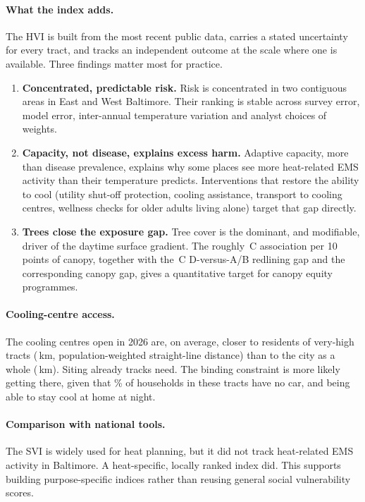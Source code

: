 \documentclass[11pt]{article}
\newcommand{\degC}{\,\textdegree C}
\begin{document}
\paragraph{What the index adds.} The HVI is built from the most recent public data, carries a stated uncertainty for every tract, and tracks an independent outcome at the scale where one is available. Three findings matter most for practice.
\begin{enumerate}
  \item \textbf{Concentrated, predictable risk.} Risk is concentrated in two contiguous areas in East and West Baltimore. Their ranking is stable across survey error, model error, inter-annual temperature variation and analyst choices of weights.
  \item \textbf{Capacity, not disease, explains excess harm.} Adaptive capacity, more than disease prevalence, explains why some places see more heat-related EMS activity than their temperature predicts. Interventions that restore the ability to cool (utility shut-off protection, cooling assistance, transport to cooling centres, wellness checks for older adults living alone) target that gap directly.
  \item \textbf{Trees close the exposure gap.} Tree cover is the dominant, and modifiable, driver of the daytime surface gradient. The roughly \BTreeTen\degC{} association per 10 points of canopy, together with the \HolcDminusAB\degC{} D-versus-A/B redlining gap and the corresponding canopy gap, gives a quantitative target for canopy equity programmes.
\end{enumerate}

\paragraph{Cooling-centre access.} The \NCool{} cooling centres open in 2026 are, on average, closer to residents of very-high tracts (\VHdist\,km, population-weighted straight-line distance) than to the city as a whole (\AllDist\,km). Siting already tracks need. The binding constraint is more likely getting there, given that \VHNoVeh\% of households in these tracts have no car, and being able to stay cool at home at night.

\paragraph{Comparison with national tools.} The SVI is widely used for heat planning, but it did not track heat-related EMS activity in Baltimore. A heat-specific, locally ranked index did. This supports building purpose-specific indices rather than reusing general social vulnerability scores.
\end{document}
